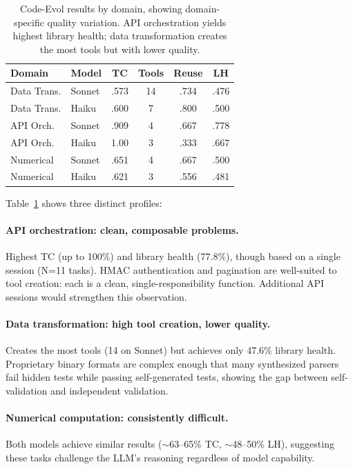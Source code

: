 \documentclass[sigplan,review,anonymous]{acmart}
\begin{document}
\begin{table}[t]
\centering
\footnotesize
\begin{tabular}{llcccc}
\toprule
\textbf{Domain} & \textbf{Model} & \textbf{TC} & \textbf{Tools} & \textbf{Reuse} & \textbf{LH} \\
\midrule
Data Trans. & Sonnet & .573 & 14 & .734 & .476 \\
Data Trans. & Haiku & .600 & 7 & .800 & .500 \\
\midrule
API Orch. & Sonnet & .909 & 4 & .667 & .778 \\
API Orch. & Haiku & 1.00 & 3 & .333 & .667 \\
\midrule
Numerical & Sonnet & .651 & 4 & .667 & .500 \\
Numerical & Haiku & .621 & 3 & .556 & .481 \\
\bottomrule
\end{tabular}
\caption{Code-Evol results by domain, showing domain-specific quality variation. API orchestration yields highest library health; data transformation creates the most tools but with lower quality.}
\label{tab:domain}
\end{table}

Table~\ref{tab:domain} shows three distinct profiles:

\paragraph{API orchestration: clean, composable problems.} Highest TC (up to 100\%) and library health (77.8\%), though based on a single session (N=11 tasks). HMAC authentication and pagination are well-suited to tool creation: each is a clean, single-responsibility function. Additional API sessions would strengthen this observation.

\paragraph{Data transformation: high tool creation, lower quality.} Creates the most tools (14 on Sonnet) but achieves only 47.6\% library health. Proprietary binary formats are complex enough that many synthesized parsers fail hidden tests while passing self-generated tests, showing the gap between self-validation and independent validation.

\paragraph{Numerical computation: consistently difficult.} Both models achieve similar results ($\sim$63--65\% TC, $\sim$48--50\% LH), suggesting these tasks challenge the LLM's reasoning regardless of model capability.
\end{document}
